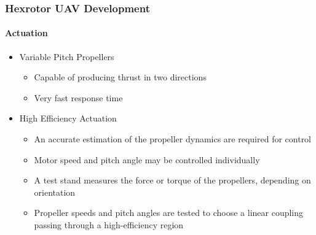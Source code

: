 \documentclass[11pt,professionalfonts,hyperref={pdftex,pdfpagemode=none,pdfstartview=FitH}]{beamer}
\begin{document}
\begin{frame}
\frametitle{Hexrotor UAV Development}
\framesubtitle{Actuation}

\begin{itemize}
\item Variable Pitch Propellers
	\begin{itemize}
	\item Capable of producing thrust in two directions
	\item Very fast response time
	\end{itemize}
\vspace*{0.3cm}\pause
\item High Efficiency Actuation
	\begin{itemize}
	\item An accurate estimation of the propeller dynamics are required for control
	\item Motor speed and pitch angle may be controlled individually
	\item A test stand measures the force or torque of the propellers, depending on orientation
	\item Propeller speeds and pitch angles are tested to choose a linear coupling passing through a high-efficiency region
	\end{itemize}


\end{itemize}
\end{frame}
\end{document}
